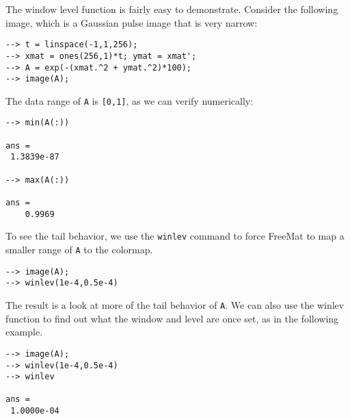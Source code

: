 The window level function is fairly easy to demonstrate.  Consider
the following image, which is a Gaussian pulse image that is very 
narrow:
\begin{verbatim}
--> t = linspace(-1,1,256);
--> xmat = ones(256,1)*t; ymat = xmat';
--> A = exp(-(xmat.^2 + ymat.^2)*100);
--> image(A);
\end{verbatim}
The data range of \verb|A| is \verb|[0,1]|, as we can verify numerically:
\begin{verbatim}
--> min(A(:))

ans = 
 1.3839e-87 

--> max(A(:))

ans = 
    0.9969 
\end{verbatim}
To see the tail behavior, we use the \verb|winlev| command to force FreeMat
to map a smaller range of \verb|A| to the colormap.
\begin{verbatim}
--> image(A);
--> winlev(1e-4,0.5e-4)
\end{verbatim}
The result is a look at more of the tail behavior of \verb|A|.
We can also use the winlev function to find out what the
window and level are once set, as in the following example.
\begin{verbatim}
--> image(A);
--> winlev(1e-4,0.5e-4)
--> winlev

ans = 
 1.0000e-04 
\end{verbatim}
